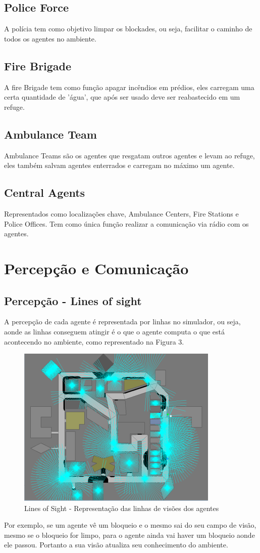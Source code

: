 \documentclass[conference]{IEEEtran}
\begin{document}
\subsection{Police Force}
A polícia tem como objetivo limpar os blockades, ou seja, facilitar o caminho de todos os agentes no ambiente.
\subsection{Fire Brigade}
A fire Brigade tem como função apagar incêndios em prédios, eles carregam uma certa quantidade de 'água', que após ser usado deve ser reabastecido em um refuge.
\subsection{Ambulance Team}
Ambulance Teams são os agentes que resgatam outros agentes e levam ao refuge, eles também salvam agentes enterrados e carregam no máximo um agente.
\subsection{Central Agents}
Representados como localizações chave, Ambulance Centers, Fire Stations e Police Offices. Tem como única função realizar a comunicação via rádio com os agentes.

\section{Percepção e Comunicação}

\subsection{Percepção - Lines of sight}
A percepção de cada agente é representada por linhas no simulador, ou seja, aonde as linhas conseguem atingir é o que o agente computa o que está acontecendo no ambiente, como representado na Figura 3.
\begin{figure}[htbp]
\centerline{\includegraphics[scale=0.5]{fig2.png}}
\caption{Lines of Sight - Representação das linhas de visões dos agentes \cite{b1}}
\label{fig}
\end{figure}
Por exemplo, se um agente vê um bloqueio e o mesmo sai do seu campo de visão, mesmo se o bloqueio for limpo, para o agente ainda vai haver um bloqueio aonde ele passou. Portanto a sua visão atualiza seu conhecimento do ambiente.
\end{document}
